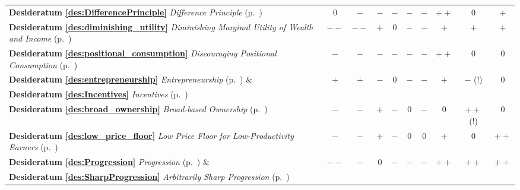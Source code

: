 \begin{landscape}
\begin{longtabu}{p{4cm}ccccccccc}
\textbf{Desideratum \ref{des:DifferencePrinciple}} \emph{Difference Principle} (p.~\pageref{des:DifferencePrinciple})   \vspace{10pt}   
&$0$			&$-$			&$-$				&$-$			&$-$			&$-$				&$++$		&$0$				&$+$\\
\textbf{Desideratum \ref{des:diminishing_utility}} \emph{Diminishing Marginal Utility of Wealth and Income} (p.~\pageref{des:diminishing_utility})\vspace{10pt}   
&$--$			&$--$			&$+$				&$0$			&$-$			&$-$				&$+$			&$+$				&$+$\\ %
\textbf{Desideratum \ref{des:positional_consumption}} \emph{Discouraging Positional Consumption} (p.~\pageref{des:positional_consumption})\vspace{10pt}   
&$-$			&$-$			&$-$				&$-$			&$-$			&$-$				&$++$		&$0$				&$0$\\ %
\textbf{Desideratum \ref{des:entrepreneurship}} \emph{Entrepreneurship} (p.~\pageref{des:entrepreneurship}) \&
&$+$			&$+$			&$-$				&$0$			&$-$			&$-$				&$+$			&$-$ (!)			&$0$\\ %
\textbf{Desideratum \ref{des:Incentives}} \emph{Incentives} (p.~\pageref{des:Incentives})\vspace{10pt}   
&			&			&				&			&			&				&			&				&\\
\textbf{Desideratum \ref{des:broad_ownership}} \emph{Broad-based Ownership} (p.~\pageref{des:broad_ownership})\vspace{10pt}   
&$-$			&$-$			&$+$				&$-$			&$0$			&$-$				&$0$			&$++$ (!)			&$0$\\ %
\textbf{Desideratum \ref{des:low_price_floor}} \emph{Low Price Floor for Low-Productivity Earners} (p.~\pageref{des:LowPriceFloor})\vspace{10pt}   
&$-$			&$-$			&$+$				&$-$			&$0$			&$0$				&$+$			&$0$				&$++$\\ %
\textbf{Desideratum \ref{des:Progression}} \emph{Progression} (p.~\pageref{des:Progression}) \& 
&$--$			&$-$			&$0$				&$-$			&$-$			&$-$				&$++$		&$++$			&$++$\\
\textbf{Desideratum \ref{des:SharpProgression}} \emph{Arbitrarily Sharp Progression} (p.~\pageref{des:SharpProgression})\vspace{10pt}   
&			&			&				&			&			&				&			&				&\\ %

\end{longtabu}
\end{landscape}
